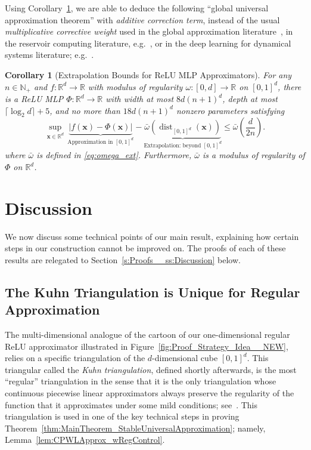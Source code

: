 \documentclass{article}
\numberwithin{equation}{section}
\newtheorem{corollary}{Corollary}[section]
\theoremstyle{definition}
\begin{document}
Using Corollary~\ref{cor:Extrapolation}, we are able to deduce the following ``global universal approximation theorem'' with \textit{additive correction term}, instead of the usual \textit{multiplicative corrective weight} used in the global approximation literature~\cite[Theorem 4.13]{cuchiero2023global}, in the reservoir computing literature, e.g.~\cite[Corollary 9]{LuydmillaJP_UAT_2018}, or in the deep learning for dynamical systems literature; e.g.~\cite[Theorem 4.11]{AcciaioKratsiosPammer_GHT_2024}. 

\begin{corollary}[Extrapolation Bounds for ReLU MLP Approximators]
\label{cor:Extrapolation}
For any $n\in\mathbb{N}_+$ and $f:\mathbb{R}^d \rightarrow\mathbb{R}$ with modulus of regularity $\omega:[0,d]\rightarrow\mathbb{R}$ on $[0,1]^d$, 
there is a ReLU MLP $\Phi:\mathbb{R}^d\to \mathbb{R}$ with width at most $8d(n+1)^d$, depth at most $\lceil \log_2{d} \rceil + 5$, and no more than $18d(n+1)^d$ nonzero parameters satisfying
\[
    \sup_{\mathbf{x}\in \mathbb{R}^d}
    \,
        \underbrace{
            |f(\mathbf{x})-\Phi(\mathbf{x})|
        }_{\text{Approximation in }[0,1]^d}
        -
        \underbrace{
            \bar{\omega}(\operatorname{dist}_{[0,1]^d}(\mathbf{x}))
        }_{\text{Extrapolation: beyond }[0,1]^d}
    \le 
        \bar{\omega}\left(\frac{d}{2n}\right)
.
\]
where $\bar{\omega}$ is defined in \eqref{eq:omega_ext}. Furthermore, $\bar{\omega}$ is a modulus of regularity of $\Phi$ on $\mathbb{R}^d$.
\end{corollary}


\section{Discussion}
\label{s:Discussion}

We now discuss some technical points of our main result, explaining how certain steps in our construction cannot be improved on.  The proofs of each of these results are relegated to Section~\ref{s:Proofs__ss:Discussion} below.


\subsection{The Kuhn Triangulation is Unique for Regular Approximation}
\label{s:Discussion__ss:KuhnTriUnique}

The multi-dimensional analogue of the cartoon of our one-dimensional regular ReLU approximator illustrated in Figure~\ref{fig:Proof_Strategy_Idea__NEW}, relies on a specific triangulation of the $d$-dimensional cube $[0,1]^d$.  This triangular called the \emph{Kuhn triangulation}, defined shortly afterwards, is the most ``regular'' triangulation in the sense that it is the only triangulation whose continuous piecewise linear approximators always preserve the regularity of the function that it approximates under some mild conditions; see~\cite[Lemma 1]{kim2023algebraic}.  This triangulation is used in one of the key technical steps in proving Theorem~\ref{thm:MainTheorem_StableUniversalApproximation}; namely, Lemma~\ref{lem:CPWLApprox_wRegControl}.
\end{document}
